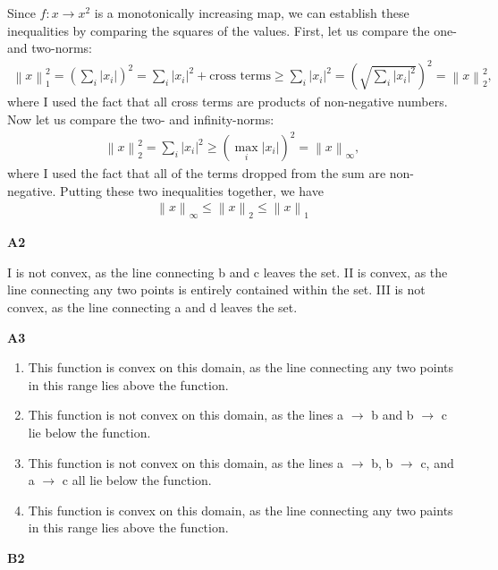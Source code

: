 \documentclass{article}
\newcommand{\norm}[1]{\left\|#1\right\|}
\begin{document}
Since $f : x \to x^2$ is a monotonically increasing map, we can establish these inequalities by comparing the squares of the values.
First, let us compare the one- and two-norms:
\begin{align*}
        \norm{x}_1^2 = \left( \sum_i |x_i| \right)^2 = \sum_i |x_i|^2 + \text{cross terms} \geq \sum_i |x_i|^2 = \left( \sqrt{\sum_i |x_i|^2} \right)^2 = \norm{x}_2^2,
\end{align*}
where I used the fact that all cross terms are products of non-negative numbers.
Now let us compare the two- and infinity-norms:
\begin{align*}
        \norm{x}_2^2 = \sum_i |x_i|^2 \geq ( \max_i |x_i| )^2 = \norm{x}_\infty,
\end{align*}
where I used the fact that all of the terms dropped from the sum are non-negative.
Putting these two inequalities together, we have
\begin{align*}
        \norm{x}_\infty \leq \norm{x}_2 \leq \norm{x}_1
\end{align*}


\textbf{A2}

I is not convex, as the line connecting b and c leaves the set.
II is convex, as the line connecting any two points is entirely contained within the set.
III is not convex, as the line connecting a and d leaves the set. \newline

\textbf{A3}

\begin{enumerate}
        \item This function is convex on this domain, as the line connecting any two points in this range lies above the function.
        \item This function is not convex on this domain, as the lines a $\to$ b and b $\to$ c lie below the function.
        \item This function is not convex on this domain, as the lines a $\to$ b, b $\to$ c, and a $\to$ c all lie below the function.
        \item This function is convex on this domain, as the line connecting any two paints in this range lies above the function.
\end{enumerate}

\textbf{B2}
\end{document}
